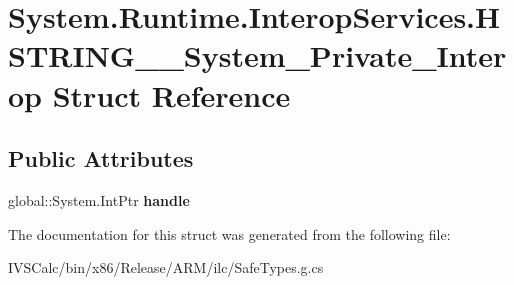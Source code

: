 \hypertarget{struct_system_1_1_runtime_1_1_interop_services_1_1_h_s_t_r_i_n_g_____system___private___interop}{}\section{System.\+Runtime.\+Interop\+Services.\+H\+S\+T\+R\+I\+N\+G\+\_\+\+\_\+\+System\+\_\+\+Private\+\_\+\+Interop Struct Reference}
\label{struct_system_1_1_runtime_1_1_interop_services_1_1_h_s_t_r_i_n_g_____system___private___interop}
\subsection*{Public Attributes}
\begin{DoxyCompactItemize}
\item 
\mbox{\label{struct_system_1_1_runtime_1_1_interop_services_1_1_h_s_t_r_i_n_g_____system___private___interop_abedad90c32c11636b7a16713b671ca3c}} 
global\+::\+System.\+Int\+Ptr {\bfseries handle}
\end{DoxyCompactItemize}


The documentation for this struct was generated from the following file\+:\begin{DoxyCompactItemize}
\item 
I\+V\+S\+Calc/bin/x86/\+Release/\+A\+R\+M/ilc/Safe\+Types.\+g.\+cs\end{DoxyCompactItemize}
